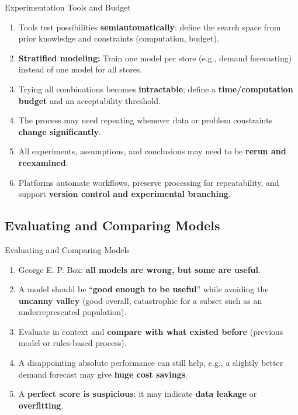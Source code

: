 \begin{frame}{Experimentation Tools and Budget}
\begin{enumerate}
\item<1-> Tools test possibilities \textbf{semiautomatically}: define the search space from prior knowledge and constraints (computation, budget).
\item<2-> \textbf{Stratified modeling:} Train one model per store (e.g., demand forecasting) instead of one model for all stores.
\item<3-> Trying all combinations becomes \textbf{intractable}; define a \textbf{time/computation budget} and an acceptability threshold.
\item<4-> The process may need repeating whenever data or problem constraints \textbf{change significantly}.
\item<5-> All experiments, assumptions, and conclusions may need to be \textbf{rerun and reexamined}.
\item<6-> Platforms automate workflows, preserve processing for repeatability, and support \textbf{version control and experimental branching}.
\end{enumerate}
\end{frame}

\subsection{Evaluating and Comparing Models}

\begin{frame}{Evaluating and Comparing Models}
\begin{enumerate}
\item<1-> George E. P. Box: \textbf{all models are wrong, but some are useful}.
\item<2-> A model should be ``\textbf{good enough to be useful}'' while avoiding the \textbf{uncanny valley} (good overall, catastrophic for a subset such as an underrepresented population).
\item<3-> Evaluate in context and \textbf{compare with what existed before} (previous model or rules-based process).
\item<4-> A disappointing absolute performance can still help, e.g., a slightly better demand forecast may give \textbf{huge cost savings}.
\item<5-> A \textbf{perfect score is suspicious}: it may indicate \textbf{data leakage} or \textbf{overfitting}.
\end{enumerate}
\end{frame}

